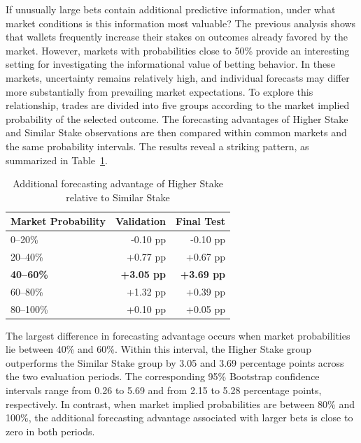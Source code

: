 If unusually large bets contain additional predictive information, under what market conditions is this information most valuable? The previous analysis shows that wallets frequently increase their stakes on outcomes already favored by the market. However, markets with probabilities close to 50\% provide an interesting setting for investigating the informational value of betting behavior. In these markets, uncertainty remains relatively high, and individual forecasts may differ more substantially from prevailing market expectations. To explore this relationship, trades are divided into five groups according to the market implied probability of the selected outcome. The forecasting advantages of Higher Stake and Similar Stake observations are then compared within common markets and the same probability intervals. The results reveal a striking pattern, as summarized in Table~\ref{tab:prob_bins}.

\begin{table}[htbp]
\centering
\caption{Additional forecasting advantage of Higher Stake relative to Similar Stake}\label{tab:prob_bins}
\begin{tabular}{lrr}
\toprule
Market Probability & Validation & Final Test \\
\midrule
0--20\% & -0.10 pp & -0.10 pp \\
20--40\% & +0.77 pp & +0.67 pp \\
\textbf{40--60\%} & \textbf{+3.05 pp} & \textbf{+3.69 pp} \\
60--80\% & +1.32 pp & +0.39 pp \\
80--100\% & +0.10 pp & +0.05 pp \\
\bottomrule
\end{tabular}
\end{table}

The largest difference in forecasting advantage occurs when market probabilities lie between 40\% and 60\%. Within this interval, the Higher Stake group outperforms the Similar Stake group by 3.05 and 3.69 percentage points across the two evaluation periods. The corresponding 95\% Bootstrap confidence intervals range from 0.26 to 5.69 and from 2.15 to 5.28 percentage points, respectively. In contrast, when market implied probabilities are between 80\% and 100\%, the additional forecasting advantage associated with larger bets is close to zero in both periods.


